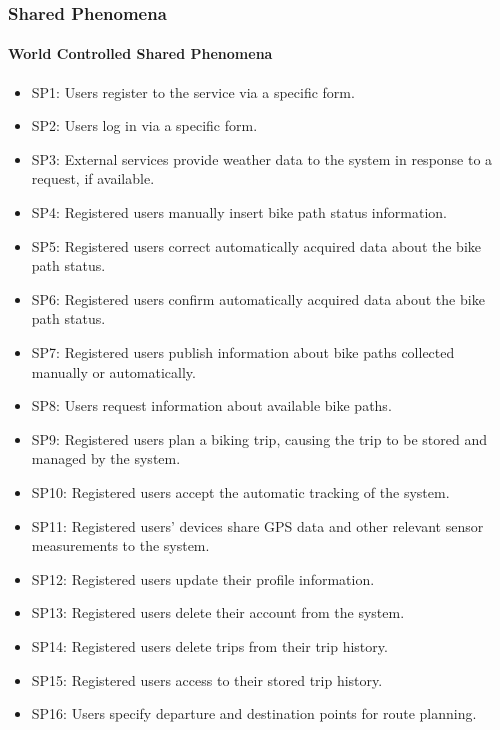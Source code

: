 \subsubsection{Shared Phenomena}

\paragraph{World Controlled Shared Phenomena}
\begin{itemize}
    \item SP1: Users register to the service via a specific form.
    \item SP2: Users log in via a specific form.
    \item SP3: External services provide weather data to the system in response to a request, if available.
    \item SP4: Registered users manually insert bike path status information.
    \item SP5: Registered users correct automatically acquired data about the bike path status.
    \item SP6: Registered users confirm automatically acquired data about the bike path status.
    \item SP7: Registered users publish information about bike paths collected manually or automatically.
    \item SP8: Users request information about available bike paths.
    \item SP9: Registered users plan a biking trip, causing the trip to be stored and managed by the system.
    \item SP10: Registered users accept the automatic tracking of the system.
    \item SP11: Registered users' devices share GPS data and other relevant sensor measurements to the system.
    \item SP12: Registered users update their profile information.
    \item SP13: Registered users delete their account from the system.
    \item SP14: Registered users delete trips from their trip history.
    \item SP15: Registered users access to their stored trip history.
    \item SP16: Users specify departure and destination points for route planning.
\end{itemize}

